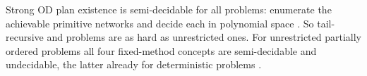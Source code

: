 Strong OD plan existence is semi-decidable for all problems: enumerate the achievable primitive
networks and decide each in polynomial space \parencite[Thm.~3.1]{chen:bercher:icaps-21}. So
tail-recursive and \REG{} problems are as hard as unrestricted ones. For unrestricted partially
ordered problems all four fixed-method concepts are semi-decidable and undecidable, the latter
already for deterministic problems \parencite{erol:et:al:amai-96,geier:bercher:ijcai-11}.
